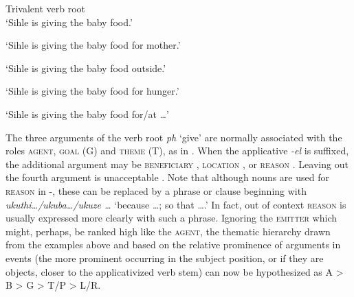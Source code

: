 \documentclass[output=paper]{langsci/langscibook}
\begin{document}
\ea\label{ex:sibanda:4}
\settowidth{}
{Trivalent verb root}\\
\glt ‘Sihle is giving the baby food.’

\glt ‘Sihle is giving the baby food for mother.’

\glt ‘Sihle is giving the baby food outside.’

\glt ‘Sihle is giving the baby food for hunger.’

\glt ‘Sihle is giving the baby food for/at …’
\z
\z


The three arguments of the verb root \textit{ph} ‘give’ are normally associated with the roles \textsc{agent}, \textsc{goal} (G) and \textsc{theme} (T), as in . When the applicative \textit{-el} is suffixed, the additional argument may be \textsc{beneficiary} , \textsc{location} , or \textsc{reason} . Leaving out the fourth argument is unacceptable . Note that although nouns are used for \textsc{reason} in -, these can be replaced by a phrase or clause beginning with \textit{ukuthi…/ukuba…/ukuze …} ‘because …; so that ….’ In fact, out of context \textsc{reason} is usually expressed more clearly with such a phrase. Ignoring the \textsc{emitter} which might, perhaps, be ranked high like the \textsc{agent}, the thematic hierarchy drawn from the examples above and based on the relative prominence of arguments in events (the more prominent occurring in the subject position, or if they are objects, closer to the applicativized verb stem) can now be hypothesized as A > B > G > T/P > L/R. 
\end{document}

